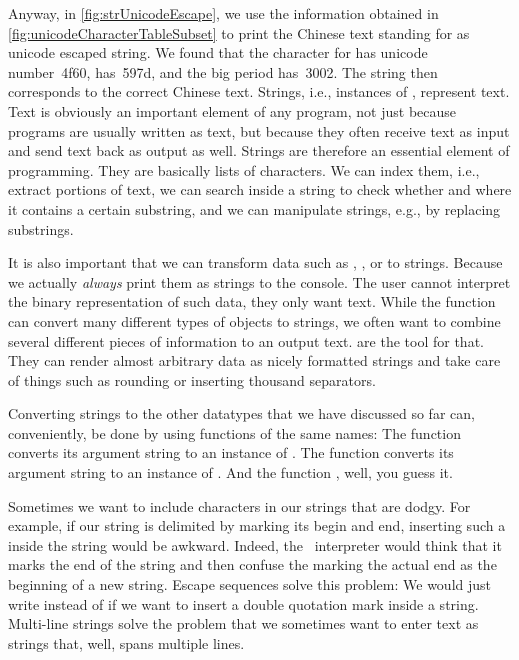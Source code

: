 Anyway, in \cref{fig:strUnicodeEscape}, we use the information obtained in \cref{fig:unicodeCharacterTableSubset} to print the Chinese text  standing for  as unicode escaped string.
We found that the character for  has unicode number~4f60,  has~597d, and the big period has~3002.
The string  then corresponds to the correct Chinese text.%
\endhsection%
%
%
Strings, i.e., instances of , represent text.
Text is obviously an important element of any program, not just because programs are usually written as text, but because they often receive text as input and send text back as output as well.
Strings are therefore an essential element of programming.
They are basically lists of characters.
We can index them, i.e., extract portions of text, we can search inside a string to check whether and where it contains a certain substring, and we can manipulate strings, e.g., by replacing substrings.

It is also important that we can transform data such as , , or  to strings.
Because we actually \emph{always} print them as strings to the console.
The user cannot interpret the binary representation of such data, they only want text.
While the function  can convert many different types of objects to strings, we often want to combine several different pieces of information to an output text.
 are the tool for that.
They can render almost arbitrary data as nicely formatted strings and take care of things such as rounding or inserting thousand separators.

Converting strings to the other datatypes that we have discussed so far can, conveniently, be done by using functions of the same names:
The function  converts its argument string to an instance of .
The function  converts its argument string to an instance of .
And the function , well, you guess it.

Sometimes we want to include characters in our strings that are dodgy.
For example, if our string is delimited by  marking its begin and end, inserting such a  inside the string would be awkward.
Indeed, the \python\ interpreter would think that it marks the end of the string and then confuse the  marking the actual end as the beginning of a new string.
Escape sequences solve this problem:
We would just write  instead of  if we want to insert a double quotation mark inside a string.
Multi-line strings solve the problem that we sometimes want to enter text as strings that, well, spans multiple lines.

